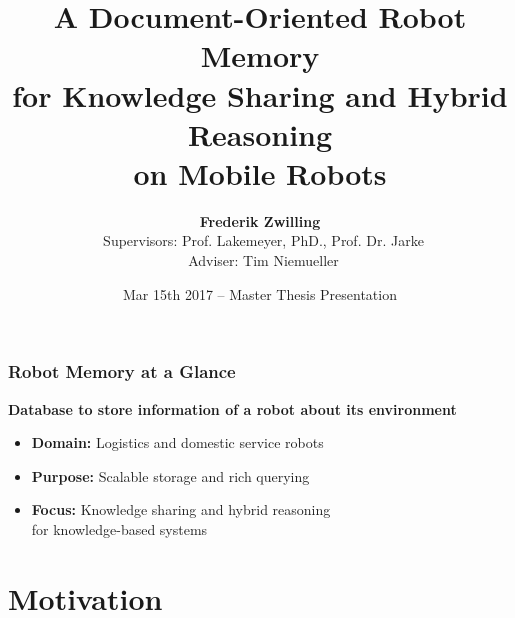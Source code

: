 




\usepackage{todonotes}
\usepackage{booktabs}
\newcommand{\tabitem}{~~\llap{\textcolor{FawkesOrange}{\textbullet}}~~}



\title[Robot Memory] {A Document-Oriented Robot Memory\\ for
  Knowledge Sharing and Hybrid Reasoning\\ on Mobile Robots}
\author[Zwilling]{
  \textbf{Frederik Zwilling}\\
  ~Supervisors: Prof. Lakemeyer, PhD., Prof. Dr. Jarke\\
  ~Adviser: Tim Niemueller
}
\def\projecturl{}

\date[Mar 15th 2017]{Mar 15th 2017 -- Master Thesis Presentation}



\frame[plain]{\titlepage}
\addtocounter{framenumber}{-1}

\begin{frame}[plain]
  \frametitle{Robot Memory at a Glance}
  \textbf{\large Database to store information of a robot about its environment}
  \bigskip
  \begin{itemize}
  \item \textbf{Domain:} Logistics and domestic service robots
  \item \textbf{Purpose:} Scalable storage and rich querying
  \item \textbf{Focus:} Knowledge sharing and hybrid reasoning\\ for knowledge-based systems
  \end{itemize}
\end{frame}

\addtocounter{framenumber}{-1}

\section{Motivation}
\begin{frame}[plain]
  \tableofcontents[currentsection]
\end{frame}
\addtocounter{framenumber}{-1}

